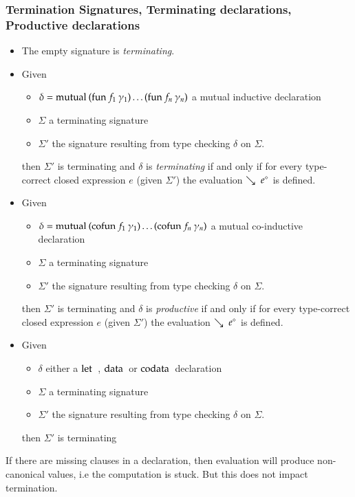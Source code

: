\subsubsection{Termination Signatures, Terminating declarations, Productive declarations}
\begin{itemize}
\item
The empty signature is \emph{terminating}.
\item
Given
\begin{itemize}
\item
$\delta = \mathrm{mutual}\: (\mathrm{fun}\: f_1 \: \gamma_1) \ldots (\mathrm{fun}\: f_n \:\gamma_n)$ a mutual inductive declaration
\item
 $\Sigma$ a terminating signature 
\item
$\Sigma'$ the signature resulting from type checking $\delta$ on $\Sigma$. 
\end{itemize}
then $\Sigma'$ is terminating and $\delta$ is \emph{terminating} if and only if for every type-correct closed expression $e$ (given $\Sigma'$) the evaluation $\searrow \; e^{\diamond}$ is defined.  
\item
Given
\begin{itemize}
\item
$\delta = \mathrm{mutual}\: (\mathrm{cofun}\: f_1 \:\gamma_1) \ldots (\mathrm{cofun}\: f_n \:\gamma_n)$ a mutual co-inductive declaration
\item
 $\Sigma$ a terminating signature 
\item
$\Sigma'$ the signature resulting from type checking $\delta$ on $\Sigma$. 
\end{itemize}
then $\Sigma'$ is terminating and $\delta$ is \emph{productive} if and only if for every type-correct closed expression $e$ (given $\Sigma'$) the evaluation $\searrow \; e^{\diamond}$ is defined.  
\item
Given
\begin{itemize}
\item
$\delta$ either a $\mathrm{let}\:$ , $\mathrm{data}\: $ or $\mathrm{codata}\:$ declaration
\item
$\Sigma$ a terminating signature 
\item
$\Sigma'$ the signature resulting from type checking $\delta$ on $\Sigma$. 
\end{itemize}
then $\Sigma'$ is terminating 
\end{itemize}

If there are missing clauses in a declaration, then evaluation will produce non-canonical values, i.e the computation is stuck. But this does not impact termination.

